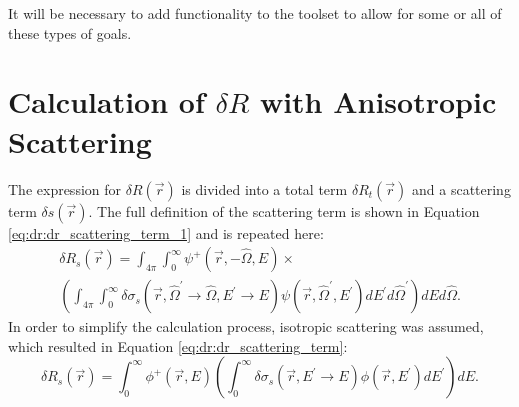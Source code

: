 It will be necessary to add functionality to the toolset to allow for some or all of these types of goals.

%

\section{Calculation of $\delta R$ with Anisotropic Scattering}
\label{sec:proposal:anisotropic_scattering}

The expression for $\delta R\left(\vec{r}\right)$ is divided into a total term $\delta R_t\left(\vec{r}\right)$ and a scattering term $\delta s\left(\vec{r}\right)$.
The full definition of the scattering term is shown in Equation \ref{eq:dr:dr_scattering_term_1} and is repeated here:
\begin{multline*}
  \delta R_s\left(\vec{r}\right) =
  \int_{4\pi}\int_0^\infty\psi^+\left(\vec{r},-\hat{\Omega},E\right) \times \\
  \left(\int_{4\pi}\int_0^\infty\delta\sigma_s\left(\vec{r},\hat{\Omega}^\prime\rightarrow\hat{\Omega},E^\prime\rightarrow E\right)\psi\left(\vec{r},\hat{\Omega}^\prime,E^\prime\right)dE^\prime d\hat{\Omega}^\prime\right)dEd\hat{\Omega}.
\end{multline*}
In order to simplify the calculation process, isotropic scattering was assumed, which resulted in Equation \ref{eq:dr:dr_scattering_term}:
\begin{equation*}
  \delta R_s\left(\vec{r}\right) =
  \int_0^\infty\phi^+\left(\vec{r},E\right)\left(\int_0^\infty\delta\sigma_s\left(\vec{r},E^\prime\rightarrow E\right)\phi\left(\vec{r},E^\prime\right)dE^\prime\right)dE.
\end{equation*}

